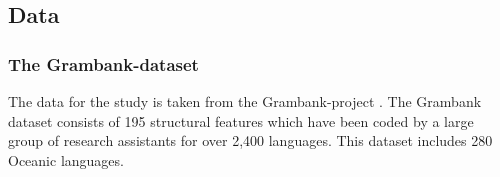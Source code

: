 \documentclass[12pt,letterpaper]{article}
\begin{document}

\FloatBarrier
\subsection{Data}

\subsubsection{The Grambank-dataset}
\label{asr:sec:GBcoverage}

The data for the study is taken from the Grambank-project \citep{grambank_release}. The Grambank dataset consists of 195 structural features which have been coded by a large group of research assistants for over 2,400 languages. This dataset includes 280 Oceanic languages. 

\end{document}
